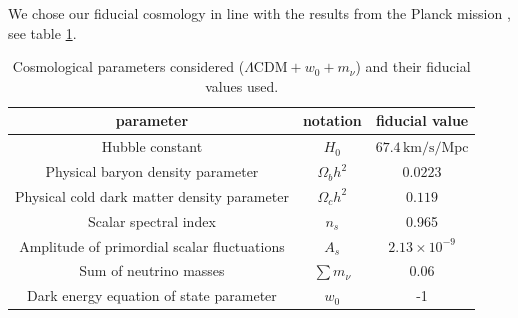 \documentclass[11pt]{article} %
\begin{document}






We chose our fiducial cosmology in line with the results from the Planck mission \cite{planckresults}, see table \ref{tab:fiducialpars}.
\begin{table}[h!]
    \centering
    \begin{tabular}{|c|c|c|}
        \hline
        \textbf{parameter} & \textbf{notation} & \textbf{fiducial value} \\
        \hline
        Hubble constant & $H_0$ & $67.4 \, \text{km/s/Mpc}$ \\
        \hline
        Physical baryon density parameter & $\Omega_b h^2$ & $0.0223$ \\
        \hline
        Physical cold dark matter density parameter & $\Omega_c h^2$ & $0.119$\\
        \hline
        Scalar spectral index & $n_s$ & 0.965 \\
        \hline
        Amplitude of primordial scalar fluctuations & $A_s$ & $2.13 \times 10^{-9}$ \\
        \hline
        Sum of neutrino masses & $\sum m_\nu$ & $0.06$\\
        \hline
        Dark energy equation of state parameter & $w_0$ & -1 \\ \hline
    \end{tabular}
    \caption{Cosmological parameters considered ($\Lambda \text{CDM} + w_0 + m_\nu$) and their fiducial values used.}
    \label{tab:fiducialpars}
\end{table}
\end{document}
